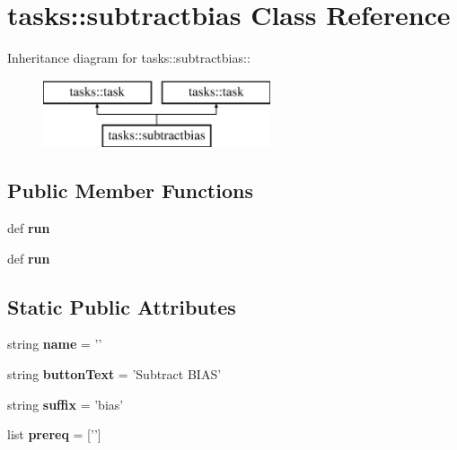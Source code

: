 \section{tasks::subtractbias Class Reference}
\label{classtasks_1_1subtractbias}
Inheritance diagram for tasks::subtractbias::\begin{figure}[H]
\begin{center}
\leavevmode
\includegraphics[height=2cm]{classtasks_1_1subtractbias}
\end{center}
\end{figure}
\subsection*{Public Member Functions}
\begin{CompactItemize}
\item 
def \textbf{run}\label{classtasks_1_1subtractbias_8951b67080e7f7a8c7e1275afc658315}

\item 
def \textbf{run}\label{classtasks_1_1subtractbias_8951b67080e7f7a8c7e1275afc658315}

\end{CompactItemize}
\subsection*{Static Public Attributes}
\begin{CompactItemize}
\item 
string \textbf{name} = '{\bfsubtractbias}'\label{classtasks_1_1subtractbias_b75ea77bfcaf6f463a717377a91b0cdf}

\item 
string \textbf{button\-Text} = 'Subtract BIAS'\label{classtasks_1_1subtractbias_7d7fd01b986c11fbcee71be4b9709bbb}

\item 
string \textbf{suffix} = 'bias'\label{classtasks_1_1subtractbias_561eb2a376e8a0b9947c15a9d2431141}

\item 
list \textbf{prereq} = ['{\bfpreproc}']\label{classtasks_1_1subtractbias_ed4f4bc20c3c9fe02bc9a3a2a7762c4a}

\end{CompactItemize}


